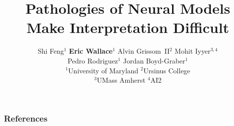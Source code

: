 \documentclass{beamer}
\title[EMNLP]{Pathologies of Neural Models Make Interpretation Difficult}
\author{
\small{
Shi Feng$^1$ \textbf{Eric Wallace}$^1$ Alvin Grissom~II$^2$ Mohit Iyyer$^{3,4}$ \\
Pedro Rodriguez$^1$ Jordan Boyd-Graber$^1$
} \\\vspace{10px}
\footnotesize{$^1$University of Maryland $^2$Ursinus College\\ $^3$UMass Amherst $^4$AI2}
}
\begin{document}
\begin{frame}
    \titlepage
\end{frame}










\begin{frame}[t, allowframebreaks]
\frametitle{References}

\small

\end{frame}
\end{document}
